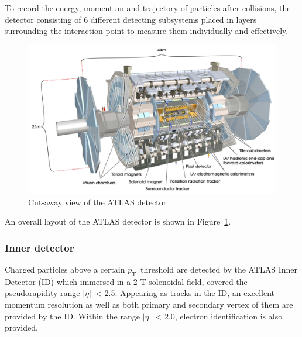 \documentclass[UTF8,12pt]{ctexart}
\numberwithin{equation}{section}
\newcommand{\pt}{\ensuremath{p_{\mathrm{T}}\xspace}}
\def\abseta{$|$$\eta$$|$~}
\begin{document}
To record the energy, momentum and trajectory of particles after collisions, the detector consisting of 6 different detecting subsystems  placed in layers surrounding the interaction point to measure them individually and effectively. 

 \begin{figure}[htb] 
	\centering  
	\includegraphics[width=14cm]{./fig/atlas.png}
	\caption{Cut-away view of the ATLAS detector}
	\label{Fig.atlas}
\end{figure}
An overall layout of the ATLAS detector is shown in Figure~\ref{Fig.atlas}.

\subsubsection{Inner detector}
\label{sec:3.2.1}

Charged particles above a certain \pt~threshold are detected by the ATLAS Inner Detector (ID) which immersed in a 2 T solenoidal field, covered the pseudorapidity range \abseta < 2.5.
Appearing as tracks in the ID, an excellent momentum resolution as well as both primary and secondary vertex of them are provided by the ID.  Within the range \abseta < 2.0,  electron identification is also provided.
\end{document}
